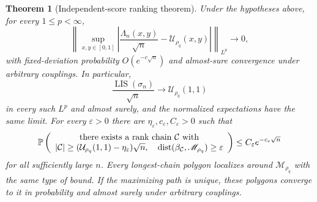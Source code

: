 \documentclass[11pt]{article}
\newtheorem{theorem}{Theorem}[section]
\theoremstyle{remark}
\newcommand{\Pp}{\mathbb P}
\newcommand{\LIS}{\operatorname{LIS}}
\newcommand{\eps}{\varepsilon}
\newcommand{\calU}{\mathcal U}
\newcommand{\norm}[1]{\left\lVert #1\right\rVert}
\newcommand{\abs}[1]{\left|#1\right|}
\newcommand{\dist}{\operatorname{dist}}
\begin{document}
\begin{theorem}[Independent-score ranking theorem]
\label{thm:independent-score}
Under the hypotheses above, for every $1\le p<\infty$,
\begin{equation}\label{eq:score-shape-law}
 \norm{\sup_{x,y\in[0,1]}
 \abs{\frac{\Lambda_n(x,y)}{\sqrt n}-\calU_{\rho_q}(x,y)}}_{L^p}
 \longrightarrow0,
\end{equation}
with fixed-deviation probability $O(e^{-c\sqrt n})$ and almost-sure
convergence under arbitrary couplings.  In particular,
\[
 \frac{\LIS(\sigma_n)}{\sqrt n}
 \longrightarrow\calU_{\rho_q}(1,1)
\]
in every such $L^p$ and almost surely, and the normalized expectations have
the same limit.  For every $\eps>0$ there are
$\eta_\eps,c_\eps,C_\eps>0$ such that
\begin{equation}\label{eq:score-localization}
 \Pp\left(
 \begin{array}{c}
 \text{there exists a rank chain }\mathcal C\text{ with}\cr
 |\mathcal C|\ge(\calU_{\rho_q}(1,1)-\eta_\eps)\sqrt n,
 \quad\dist(\beta_{\mathcal C},\mathscr M_{\rho_q})\ge\eps
 \end{array}
 \right)
 \le C_\eps e^{-c_\eps\sqrt n}
\end{equation}
for all sufficiently large $n$.  Every longest-chain polygon localizes
around $\mathscr M_{\rho_q}$ with the same type of bound.  If the maximizing
path is unique, these polygons converge to it in probability and almost
surely under arbitrary couplings.
\end{theorem}
\end{document}
